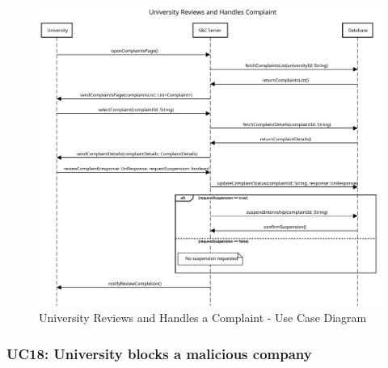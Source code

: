 \begin{figure}[H]
    \centering
    \includegraphics[width=1.0\textwidth]{Images/UC_16.pdf}
    \caption{University Reviews and Handles a Complaint - Use Case Diagram}
    \label{fig:use-case-diagram-17}
\end{figure}


\subsubsection{UC18: University blocks a malicious company}
\label{subsubsec:university-blocks-a-malicious-company}

